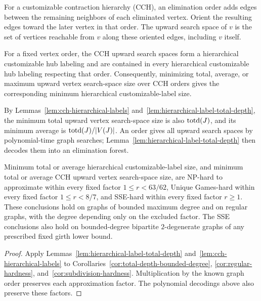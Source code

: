 For a customizable contraction hierarchy (CCH), an elimination order adds edges
between the remaining neighbors of each eliminated vertex. Orient
the resulting edges toward the later vertex in that order.
The upward search space of $v$ is the set of vertices reachable
from $v$ along these oriented edges, including $v$ itself.
\begin{lemma}
\label{lem:cch-hierarchical-labels}
For a fixed vertex order, the CCH upward search spaces form a
hierarchical customizable hub labeling and are contained in every
hierarchical customizable hub labeling respecting that order.
Consequently, minimizing total, average, or maximum upward vertex
search-space size over CCH orders gives the corresponding minimum
hierarchical customizable-label size.
\end{lemma}

By Lemmas~\ref{lem:cch-hierarchical-labels}
and~\ref{lem:hierarchical-label-total-depth},
the minimum total upward vertex search-space size is
also $\operatorname{totd}(J)$, and its minimum average is $\operatorname{totd}(J)/|V(J)|$.
An order gives all upward search spaces by polynomial-time graph searches;
Lemma~\ref{lem:hierarchical-label-total-depth} then decodes them
into an elimination forest.

\begin{corollary}\label{cor:hierarchical-label-hardness}
Minimum total or average hierarchical customizable-label size, and
minimum total or average CCH upward vertex search-space size, are
NP-hard to approximate within every fixed factor $1\leq r<63/62$,
Unique Games-hard within every fixed factor $1\leq r<8/7$, and
SSE-hard within every fixed factor $r\geq1$. These conclusions hold
on graphs of bounded maximum degree and on regular graphs, with the
degree depending only on the excluded factor. The SSE conclusions also
hold on bounded-degree bipartite $2$-degenerate graphs of any prescribed
fixed girth lower bound.
\end{corollary}
\begin{proof}
Apply Lemmas~\ref{lem:hierarchical-label-total-depth}
and~\ref{lem:cch-hierarchical-labels} to
Corollaries~\ref{cor:total-depth-bounded-degree},
\ref{cor:regular-hardness}, and~\ref{cor:subdivision-hardness}.
Multiplication by the known graph order preserves each approximation
factor. The polynomial decodings above also preserve these factors.
\end{proof}

